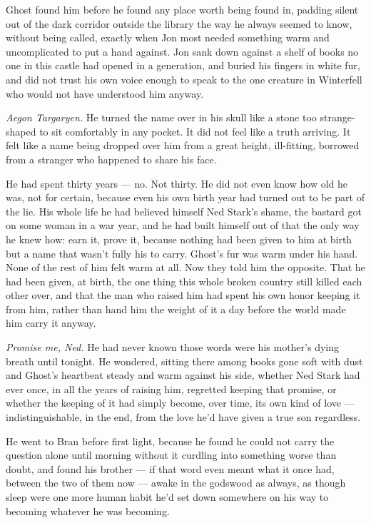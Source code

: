 Ghost found him before he found any place worth being found in, padding silent out of the dark corridor outside the library the way he always seemed to know, without being called, exactly when Jon most needed something warm and uncomplicated to put a hand against. Jon sank down against a shelf of books no one in this castle had opened in a generation, and buried his fingers in white fur, and did not trust his own voice enough to speak to the one creature in Winterfell who would not have understood him anyway.

\textit{Aegon Targaryen.} He turned the name over in his skull like a stone too strange-shaped to sit comfortably in any pocket. It did not feel like a truth arriving. It felt like a name being dropped over him from a great height, ill-fitting, borrowed from a stranger who happened to share his face.

He had spent thirty years — no. Not thirty. He did not even know how old he was, not for certain, because even his own birth year had turned out to be part of the lie. His whole life he had believed himself Ned Stark’s shame, the bastard got on some woman in a war year, and he had built himself out of that the only way he knew how: earn it, prove it, because nothing had been given to him at birth but a name that wasn’t fully his to carry. Ghost’s fur was warm under his hand. None of the rest of him felt warm at all. Now they told him the opposite. That he had been given, at birth, the one thing this whole broken country still killed each other over, and that the man who raised him had spent his own honor keeping it from him, rather than hand him the weight of it a day before the world made him carry it anyway.

\textit{Promise me, Ned.} He had never known those words were his mother’s dying breath until tonight. He wondered, sitting there among books gone soft with dust and Ghost’s heartbeat steady and warm against his side, whether Ned Stark had ever once, in all the years of raising him, regretted keeping that promise, or whether the keeping of it had simply become, over time, its own kind of love — indistinguishable, in the end, from the love he’d have given a true son regardless.

\sceneBreak

He went to Bran before first light, because he found he could not carry the question alone until morning without it curdling into something worse than doubt, and found his brother — if that word even meant what it once had, between the two of them now — awake in the godswood as always, as though sleep were one more human habit he’d set down somewhere on his way to becoming whatever he was becoming.

